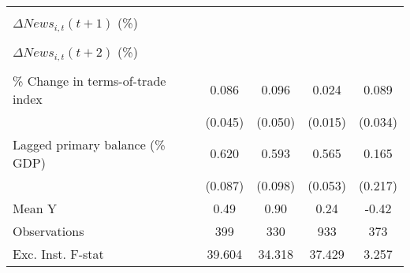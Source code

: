 {\begin{tabular}{l*{4}{c}}
                    &                     &                     &                     &                     \\
\addlinespace
$ \Delta News_{i,t}(t+1)$ (\%)&                     &                     &                     &                     \\
                    &                     &                     &                     &                     \\
\addlinespace
$ \Delta News_{i,t}(t+2)$ (\%)&                     &                     &                     &                     \\
                    &                     &                     &                     &                     \\
\addlinespace
\% Change in terms-of-trade index&       0.086\sym{*}  &       0.096\sym{*}  &       0.024         &       0.089\sym{***}\\
                    &     (0.045)         &     (0.050)         &     (0.015)         &     (0.034)         \\
\addlinespace
Lagged primary balance (\% GDP)&       0.620\sym{***}&       0.593\sym{***}&       0.565\sym{***}&       0.165         \\
                    &     (0.087)         &     (0.098)         &     (0.053)         &     (0.217)         \\
\midrule
Mean Y              &        0.49         &        0.90         &        0.24         &       -0.42         \\
Observations        &         399         &         330         &         933         &         373         \\
Exc. Inst. F-stat   &      39.604         &      34.318         &      37.429         &       3.257         \\
\bottomrule
\end{tabular}
}
